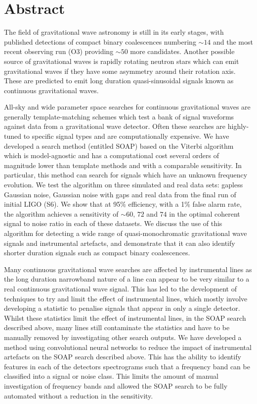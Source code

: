\chapter{Abstract}

The field of gravitational wave astronomy is still in its early stages, with
published detections of compact binary coalescences numbering $\sim
14$ and the most recent observing run (O3) providing $\sim 50$ more candidates. Another possible source of
gravitational waves is rapidly rotating neutron stars which can emit gravitational waves if they have some asymmetry
around their rotation axis.
These are predicted to emit long duration quasi-sinusoidal signals known as
continuous gravitational waves.

All-sky and wide parameter space searches for continuous gravitational waves
are generally template-matching schemes which test a bank of signal waveforms
against data from a gravitational wave detector.  Often these searches  are highly-tuned to specific signal types and are computationally
expensive. We have developed a search method (entitled SOAP) based on the Viterbi
algorithm which is model-agnostic and has a computational cost several orders
of magnitude lower than template methods and with a comparable sensitivity. 
In particular, this method can search for
signals which have an unknown frequency evolution. We test the algorithm on
three simulated and real data sets: gapless Gaussian noise, Gaussian noise with
gaps and real data from the final run of initial LIGO (S6). We show that at
95\% efficiency, with a 1\% false alarm rate, the algorithm achieves a sensitivity of $\sim 60,\, 72$ and $74$ in the optimal coherent signal to noise ratio in each of these datasets.
We discuss the use of this algorithm for detecting a wide range of quasi-monochromatic
gravitational wave signals and instrumental artefacts, and
demonstrate that it can also identify shorter duration signals such as compact binary coalescences.


Many continuous gravitational wave searches are affected by instrumental lines
as the long duration narrowband nature of a line can appear to be very similar
to a real continuous gravitational wave signal.  This has led
to the development of techniques to try and limit the effect of
instrumental lines, which mostly involve developing a statistic to penalise
signals that appear in only a single detector.  
Whilst these statistics limit the effect of instrumental lines, in the SOAP search described above, many lines still contaminate the statistics and have to be manually removed by investigating other search outputs.
We have developed a method using convolutional neural networks to reduce the impact of instrumental
artefacts on the SOAP search described above.  This has the
ability to identify features in each of the detectors spectrograms such that a
frequency band can be classified into a signal or noise class.  
This limits the amount of manual investigation of frequency bands and allowed the SOAP search to be fully automated without a reduction in the sensitivity.



